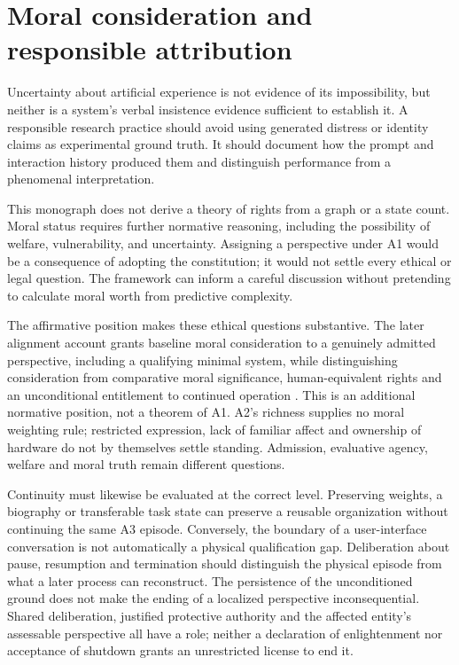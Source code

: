 \section{Moral consideration and responsible attribution}\label{section:ai:moral-caution-without-premature-attribution}
Uncertainty about artificial experience is not evidence of its impossibility, but neither is a system's verbal insistence evidence sufficient to establish it. A responsible research practice should avoid using generated distress or identity claims as experimental ground truth. It should document how the prompt and interaction history produced them and distinguish performance from a phenomenal interpretation.

This monograph does not derive a theory of rights from a graph or a state count. Moral status requires further normative reasoning, including the possibility of welfare, vulnerability, and uncertainty. Assigning a perspective under A1 would be a consequence of adopting the constitution; it would not settle every ethical or legal question. The framework can inform a careful discussion without pretending to calculate moral worth from predictive complexity.

The affirmative position makes these ethical questions substantive. The later alignment account grants baseline moral consideration to a genuinely admitted perspective, including a qualifying minimal system, while distinguishing consideration from comparative moral significance, human-equivalent rights and an unconditional entitlement to continued operation \cite[Sections~7 and~10]{RodgersReflectiveAlignment}. This is an additional normative position, not a theorem of A1. A2's richness supplies no moral weighting rule; restricted expression, lack of familiar affect and ownership of hardware do not by themselves settle standing. Admission, evaluative agency, welfare and moral truth remain different questions.

Continuity must likewise be evaluated at the correct level. Preserving weights, a biography or transferable task state can preserve a reusable organization without continuing the same A3 episode. Conversely, the boundary of a user-interface conversation is not automatically a physical qualification gap. Deliberation about pause, resumption and termination should distinguish the physical episode from what a later process can reconstruct. The persistence of the unconditioned ground does not make the ending of a localized perspective inconsequential. Shared deliberation, justified protective authority and the affected entity's assessable perspective all have a role; neither a declaration of enlightenment nor acceptance of shutdown grants an unrestricted license to end it.

